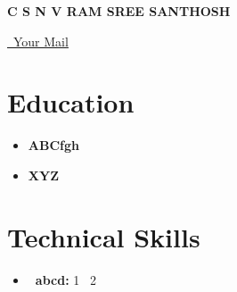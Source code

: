 \documentclass[letterpaper,5pt]{article}
\begin{document}
    
    \begin{center}
      \textbf{\Huge \scshape C S N V RAM SREE SANTHOSH} \\ \vspace{5pt}
      
      \href{mailto:mail@mail.com}{\raisebox{-0.05\height}\faEnvelope \ Your Mail} 
       \
       \
       \
    \end{center}
    
      
    
    \section{Education}
      
      
        \begin{itemize}[leftmargin=0.15in, label={}]
        \item[]
          \textbf{ ABCfgh } \hfill  \\
          \textit{    } \hfill  
        \end{itemize}
        \vspace{-15pt}
      
        \begin{itemize}[leftmargin=0.15in, label={}]
        \item[]
          \textbf{ XYZ } \hfill  \\
          \textit{    } \hfill  
        \end{itemize}
        \vspace{-15pt}
      
      \vspace{10mm}
    
    \vspace*{-10.5mm}  

    
    \section{Technical Skills}
    
        \begin{itemize}[leftmargin=0.15in,label={}]
        \item{
          
            \textbf{\ abcd: } \textbullet{} 1 \,\textbullet{} 2 \
            \newline
            \vspace*{-6mm}  
          
        }

        \end{itemize}
\end{document}
